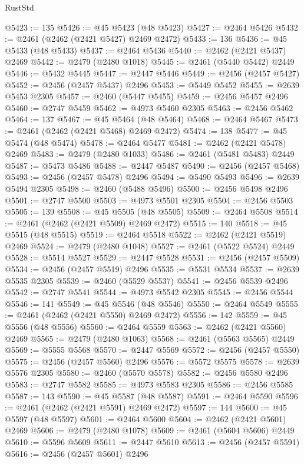 \begin{lexlean}{RustStd}
\begin{coremodule}
@5423 := 135
@5426 := @45 @5423 (@48 @5423)
@5427 := @2464 @5426
@5432 := @2461 (@2462 (@2421 @5427) @2469 @2472)
@5433 := 136
@5436 := @45 @5433 (@48 @5433)
@5437 := @2464 @5436
@5440 := @2462 (@2421 @5437) @2469
@5442 := @2479 (@2480 @1018)
@5445 := @2461 (@5440 @5442) @2449
@5446 := @5432 @5445
@5447 := @2447 @5446
@5449 := @2456 (@2457 @5427)
@5452 := @2456 (@2457 @5437) @2496
@5453 := @5449 @5452
@5455 := @2639 @5453 @2305
@5457 := @2460 (@5447 @5455)
@5459 := @2456 @5457 @2496
@5460 := @2747 @5459
@5462 := @4973 @5460 @2305
@5463 := @2456 @5462
@5464 := 137
@5467 := @45 @5464 (@48 @5464)
@5468 := @2464 @5467
@5473 := @2461 (@2462 (@2421 @5468) @2469 @2472)
@5474 := 138
@5477 := @45 @5474 (@48 @5474)
@5478 := @2464 @5477
@5481 := @2462 (@2421 @5478) @2469
@5483 := @2479 (@2480 @1033)
@5486 := @2461 (@5481 @5483) @2449
@5487 := @5473 @5486
@5488 := @2447 @5487
@5490 := @2456 (@2457 @5468)
@5493 := @2456 (@2457 @5478) @2496
@5494 := @5490 @5493
@5496 := @2639 @5494 @2305
@5498 := @2460 (@5488 @5496)
@5500 := @2456 @5498 @2496
@5501 := @2747 @5500
@5503 := @4973 @5501 @2305
@5504 := @2456 @5503
@5505 := 139
@5508 := @45 @5505 (@48 @5505)
@5509 := @2464 @5508
@5514 := @2461 (@2462 (@2421 @5509) @2469 @2472)
@5515 := 140
@5518 := @45 @5515 (@48 @5515)
@5519 := @2464 @5518
@5522 := @2462 (@2421 @5519) @2469
@5524 := @2479 (@2480 @1048)
@5527 := @2461 (@5522 @5524) @2449
@5528 := @5514 @5527
@5529 := @2447 @5528
@5531 := @2456 (@2457 @5509)
@5534 := @2456 (@2457 @5519) @2496
@5535 := @5531 @5534
@5537 := @2639 @5535 @2305
@5539 := @2460 (@5529 @5537)
@5541 := @2456 @5539 @2496
@5542 := @2747 @5541
@5544 := @4973 @5542 @2305
@5545 := @2456 @5544
@5546 := 141
@5549 := @45 @5546 (@48 @5546)
@5550 := @2464 @5549
@5555 := @2461 (@2462 (@2421 @5550) @2469 @2472)
@5556 := 142
@5559 := @45 @5556 (@48 @5556)
@5560 := @2464 @5559
@5563 := @2462 (@2421 @5560) @2469
@5565 := @2479 (@2480 @1063)
@5568 := @2461 (@5563 @5565) @2449
@5569 := @5555 @5568
@5570 := @2447 @5569
@5572 := @2456 (@2457 @5550)
@5575 := @2456 (@2457 @5560) @2496
@5576 := @5572 @5575
@5578 := @2639 @5576 @2305
@5580 := @2460 (@5570 @5578)
@5582 := @2456 @5580 @2496
@5583 := @2747 @5582
@5585 := @4973 @5583 @2305
@5586 := @2456 @5585
@5587 := 143
@5590 := @45 @5587 (@48 @5587)
@5591 := @2464 @5590
@5596 := @2461 (@2462 (@2421 @5591) @2469 @2472)
@5597 := 144
@5600 := @45 @5597 (@48 @5597)
@5601 := @2464 @5600
@5604 := @2462 (@2421 @5601) @2469
@5606 := @2479 (@2480 @1078)
@5609 := @2461 (@5604 @5606) @2449
@5610 := @5596 @5609
@5611 := @2447 @5610
@5613 := @2456 (@2457 @5591)
@5616 := @2456 (@2457 @5601) @2496

\end{coremodule}
\end{lexlean}
